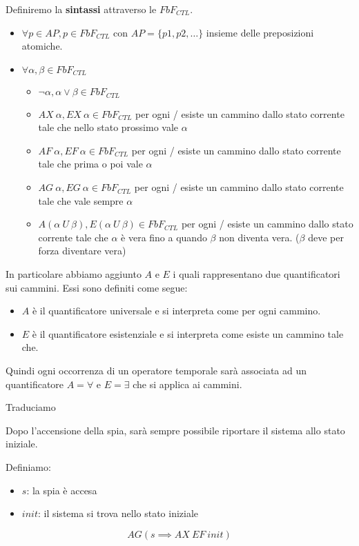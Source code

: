 Definiremo la \textbf{sintassi} attraverso le $FbF_{CTL}$.
\begin{itemize}
    \item $\forall p \in AP, p\in FbF_{CTL}$ con $AP = \{p1,p2,\dots\}$
          insieme delle preposizioni atomiche.
    \item $\forall \alpha, \beta \in FbF_{CTL}$
          \begin{itemize}
              \item $\lnot\alpha, \alpha \lor \beta \in FbF_{CTL}$
              \item $AX \ \alpha, EX \ \alpha \in FbF_{CTL}$ per ogni / esiste
                    un cammino dallo stato corrente tale che nello stato prossimo
                    vale $\alpha$
              \item $AF \ \alpha, EF \ \alpha \in FbF_{CTL}$ per ogni / esiste
                    un cammino dallo stato corrente tale che prima o poi vale $\alpha$
              \item $AG \ \alpha, EG \ \alpha \in FbF_{CTL}$ per ogni / esiste
                    un cammino dallo stato corrente tale che vale sempre $\alpha$
              \item $A(\alpha \ U \ \beta), E(\alpha \ U \ \beta)\in FbF_{CTL}$
                    per ogni / esiste un cammino dallo stato corrente tale che
                    $\alpha$ è vera fino a quando $\beta$ non diventa vera.
                    ($\beta$ deve per forza diventare vera)
          \end{itemize}
\end{itemize}
In particolare abbiamo aggiunto $A$ e $E$ i quali rappresentano due quantificatori
sui cammini. Essi sono definiti come segue:
\begin{itemize}
    \item $A$ è il quantificatore universale e si interpreta come per ogni cammino.
    \item $E$ è il quantificatore esistenziale e si interpreta come esiste un
          cammino tale che.
\end{itemize}
Quindi ogni occorrenza di un operatore temporale sarà associata ad un
quantificatore $A = \forall$ e $E = \exists$ che si applica ai cammini.
\begin{esempio}
    Traduciamo
    \begin{center}
        Dopo l'accensione della spia, sarà sempre possibile riportare il sistema
        allo stato iniziale.
    \end{center}
    Definiamo:
    \begin{itemize}
        \item $s$: la spia è accesa
        \item $init$: il sistema si trova nello stato iniziale
    \end{itemize}
    \begin{equation}
        AG(s\implies AX \ EF \ init)
    \end{equation}
\end{esempio}
